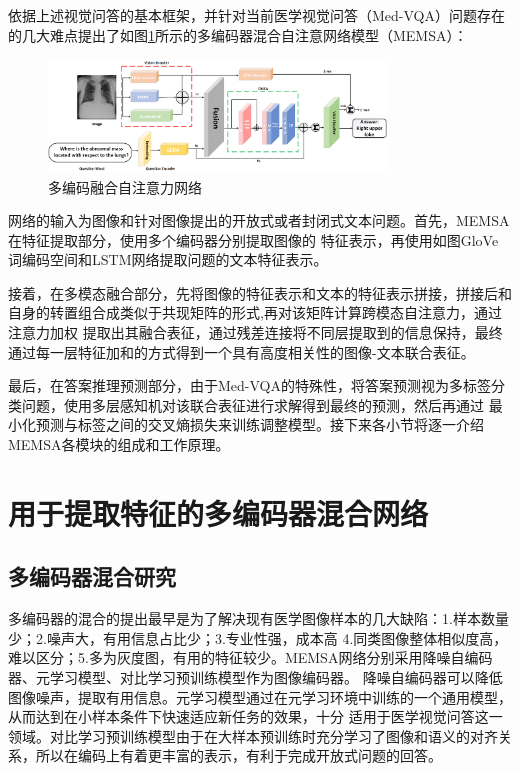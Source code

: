 依据上述视觉问答的基本框架，并针对当前医学视觉问答（Med-VQA）问题存在的几大难点提出了如图\ref{fig:memsa}所示的多编码器混合自注意网络模型（MEMSA）：
\begin{figure}[htbp]
	\centering	
	\includegraphics[width=0.8\textwidth]{Fig/myfig/chapter3/modal_net.png}  %
	\caption{\label{fig:memsa}多编码融合自注意力网络} 
\end{figure}

网络的输入为图像和针对图像提出的开放式或者封闭式文本问题。首先，MEMSA在特征提取部分，使用多个编码器分别提取图像的
特征表示，再使用如图GloVe词编码空间和LSTM网络提取问题的文本特征表示。

接着，在多模态融合部分，先将图像的特征表示和文本的特征表示拼接，拼接后和自身的转置组合成类似于共现矩阵的形式,再对该矩阵计算跨模态自注意力，通过注意力加权
提取出其融合表征，通过残差连接将不同层提取到的信息保持，最终通过每一层特征加和的方式得到一个具有高度相关性的图像-文本联合表征。

最后，在答案推理预测部分，由于Med-VQA的特殊性，将答案预测视为多标签分类问题，使用多层感知机对该联合表征进行求解得到最终的预测，然后再通过
最小化预测与标签之间的交叉熵损失来训练调整模型。接下来各小节将逐一介绍MEMSA各模块的组成和工作原理。

\section{用于提取特征的多编码器混合网络}
\subsection{多编码器混合研究}
多编码器的混合的提出最早是为了解决现有医学图像样本的几大缺陷\cite{lin2021medical}：1.样本数量少；2.噪声大，有用信息占比少；3.专业性强，成本高
4.同类图像整体相似度高，难以区分；5.多为灰度图，有用的特征较少。MEMSA网络分别采用降噪自编码器、元学习模型、对比学习预训练模型作为图像编码器。
降噪自编码器可以降低图像噪声，提取有用信息。元学习模型通过在元学习环境中训练的一个通用模型，从而达到在小样本条件下快速适应新任务的效果，十分
适用于医学视觉问答这一领域。对比学习预训练模型由于在大样本预训练时充分学习了图像和语义的对齐关系，所以在编码上有着更丰富的表示，有利于完成开放式问题的回答。

